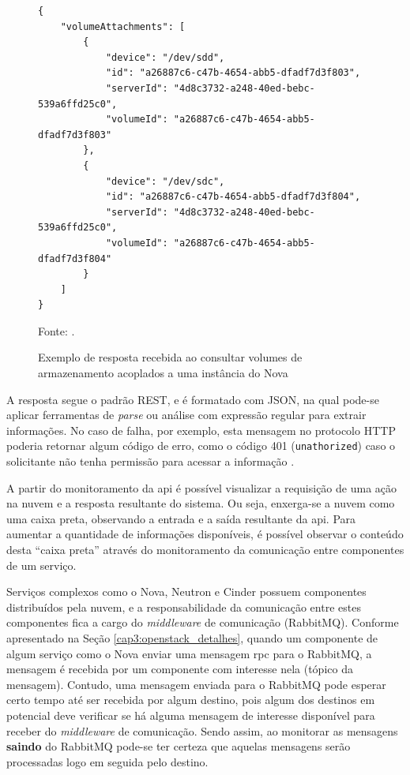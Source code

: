 \begin{figure}[!htb]
	\centering
    \caption{Exemplo de resposta recebida ao consultar volumes de armazenamento acoplados a uma instância do Nova}
    \begin{verbatim}
{
    "volumeAttachments": [
        {
            "device": "/dev/sdd",
            "id": "a26887c6-c47b-4654-abb5-dfadf7d3f803",
            "serverId": "4d8c3732-a248-40ed-bebc-539a6ffd25c0",
            "volumeId": "a26887c6-c47b-4654-abb5-dfadf7d3f803"
        },
        {
            "device": "/dev/sdc",
            "id": "a26887c6-c47b-4654-abb5-dfadf7d3f804",
            "serverId": "4d8c3732-a248-40ed-bebc-539a6ffd25c0",
            "volumeId": "a26887c6-c47b-4654-abb5-dfadf7d3f804"
        }
    ]
}
	\end{verbatim}
    \label{code:nova_api_response}
    Fonte: \cite{openstack:nova_api_response}.
\end{figure}

A resposta segue o padrão REST, e é formatado com JSON, na qual pode-se aplicar ferramentas de \textit{parse} ou análise com expressão regular para extrair informações.
%
No caso de falha, por exemplo, esta mensagem no protocolo HTTP poderia retornar algum código de erro, como o código 401 (\texttt{unathorized}) caso o solicitante não tenha permissão para acessar a informação \cite{openstack:nova_api_response}.

A partir do monitoramento da \ac{api} é possível visualizar a requisição de uma ação na nuvem e a resposta resultante do sistema.
%
Ou seja, enxerga-se a nuvem como uma caixa preta, observando a entrada e a saída resultante da \ac{api}.
%
Para aumentar a quantidade de informações disponíveis, é possível observar o conteúdo desta ``caixa preta'' através do monitoramento da comunicação entre componentes de um serviço.

Serviços complexos como o Nova, Neutron e Cinder possuem componentes distribuídos pela nuvem, e a responsabilidade da comunicação entre estes componentes fica a cargo do \textit{middleware} de comunicação (RabbitMQ).
%
Conforme apresentado na Seção \ref{cap3:openstack_detalhes}, quando um componente de algum serviço como o Nova enviar uma mensagem \ac{rpc} para o RabbitMQ, a mensagem é recebida por um componente com interesse nela (tópico da mensagem).
%
Contudo, uma mensagem enviada para o RabbitMQ pode esperar certo tempo até ser recebida por algum destino, pois algum dos destinos em potencial deve verificar se há alguma mensagem de interesse disponível para receber do \textit{middleware} de comunicação.
%
Sendo assim, ao monitorar as mensagens \textbf{saindo} do RabbitMQ pode-se ter certeza que aquelas mensagens serão processadas logo em seguida pelo destino.

